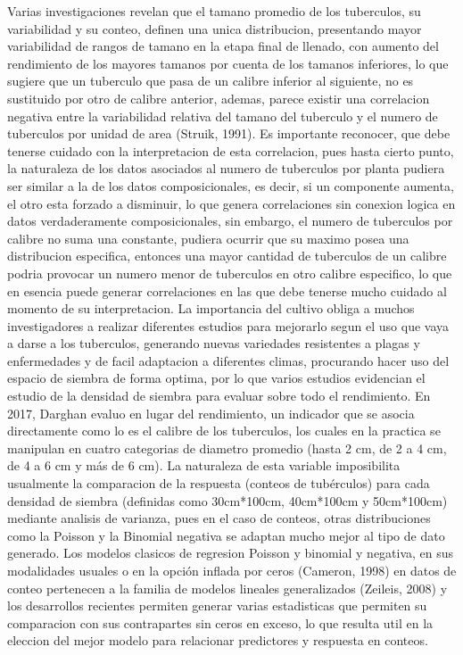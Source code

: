 Varias investigaciones revelan que el tamano promedio de los tuberculos, su variabilidad y su conteo, definen una unica distribucion, presentando mayor variabilidad de rangos de tamano en la etapa final de llenado, con aumento del rendimiento de los mayores tamanos por cuenta de los tamanos inferiores, lo que sugiere que un tuberculo que pasa de un calibre inferior al siguiente, no es sustituido por otro de calibre anterior, ademas, parece existir una correlacion negativa entre la variabilidad relativa del tamano del tuberculo y el numero de tuberculos por unidad de area (Struik, 1991). Es importante reconocer, que debe tenerse cuidado con la interpretacion de esta correlacion, pues hasta cierto punto, la naturaleza de los datos asociados al numero de tuberculos por planta pudiera ser similar a la de los datos composicionales, es decir, si un componente aumenta, el otro esta forzado a disminuir, lo que genera correlaciones sin conexion logica en datos verdaderamente composicionales, sin embargo, el numero de tuberculos por calibre no suma una constante, pudiera ocurrir que su maximo posea una distribucion especifica, entonces una mayor cantidad de tuberculos de un calibre podria provocar un numero menor de tuberculos en otro calibre especifico, lo que en esencia puede generar correlaciones en las que debe tenerse mucho cuidado al momento de su interpretacion. La importancia del cultivo obliga a muchos investigadores a realizar diferentes estudios para mejorarlo segun el uso que vaya a darse a los tuberculos, generando nuevas variedades resistentes a plagas y enfermedades y de facil adaptacion a diferentes climas, procurando hacer uso del espacio de siembra de forma optima, por lo que varios estudios evidencian el estudio de la densidad de siembra para evaluar sobre todo el rendimiento. En 2017, Darghan evaluo en lugar del rendimiento, un indicador que se asocia directamente como lo es el calibre de los tuberculos, los cuales en la practica se manipulan en cuatro categorias de diametro promedio (hasta 2 cm, de 2 a 4 cm, de 4 a 6 cm y más de 6 cm). La naturaleza de esta variable imposibilita usualmente la comparacion de la respuesta (conteos de tubérculos) para cada densidad de siembra (definidas como 30cm*100cm, 40cm*100cm y 50cm*100cm) mediante analisis de varianza, pues en el caso de conteos, otras distribuciones como la Poisson y la Binomial negativa se adaptan mucho mejor al tipo de dato generado. Los modelos clasicos de regresion Poisson y binomial y negativa, en sus modalidades usuales o en la opción inflada por ceros (Cameron, 1998) en datos de conteo pertenecen a la familia de modelos lineales generalizados (Zeileis, 2008) y los desarrollos recientes permiten generar varias estadisticas que permiten su comparacion con sus contrapartes sin ceros en exceso, lo que resulta util en la eleccion del mejor modelo para relacionar predictores y respuesta en conteos.\\

